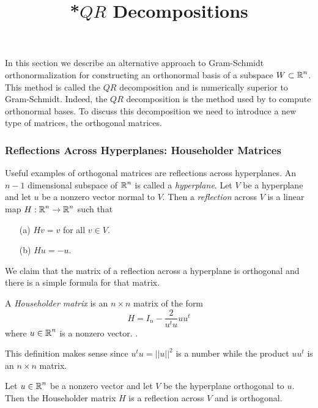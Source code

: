 \documentclass{ximera}
\title{*$QR$ Decompositions}
\begin{document}
\begin{abstract}
\end{abstract}
\maketitle


\label{S:QR}

In this section we describe an alternative approach to Gram-Schmidt
orthonormalization for constructing an orthonormal basis of a subspace
$W\subset\mbox{$\Bbb{R}$}^n$.  This method is called the $QR$ decomposition and is
numerically
superior to Gram-Schmidt.  Indeed, the $QR$ decomposition is the method used by
\Matlab to compute orthonormal bases.  To discuss this decomposition we need
to introduce a new type of matrices, the orthogonal matrices.

\subsubsection*{Reflections Across Hyperplanes: Householder Matrices}

Useful examples of orthogonal matrices are reflections across
hyperplanes.  An $n-1$ dimensional subspace of $\mbox{$\Bbb{R}$}^n$ is called a
{\em hyperplane\/}.  Let $V$ be a hyperplane and let $u$
be a nonzero vector normal to $V$.  Then a
{\em reflection\/} across $V$ is
a linear map $H:\mbox{$\Bbb{R}$}^n\to\mbox{$\Bbb{R}$}^n$ such that
\begin{itemize}
\item[(a)] $Hv=v$ for all $v\in V$.
\item[(b)] $Hu = -u$.
\end{itemize}
We claim that the matrix of a reflection across a hyperplane is orthogonal
and there is a simple formula for that matrix.
\begin{definition} \label{D:Householder}
A {\em Householder matrix\/} is an $n\times n$ matrix of the form
\begin{equation} \label{eq:householder}
H=I_n - \frac{2}{u^tu} u u^t
\end{equation}
where $u\in\mbox{$\Bbb{R}$}^n$ is a nonzero vector. .
\end{definition}
This definition makes sense since $u^tu=||u||^2$ is a number while the
product $u u^t$ is an $n\times n$ matrix.

\begin{lemma}
Let $u\in\mbox{$\Bbb{R}$}^n$ be a nonzero vector and let $V$ be the hyperplane orthogonal
to $u$.  Then the Householder matrix $H$ is a
reflection across $V$ and is orthogonal.
\end{lemma}
\end{document}
